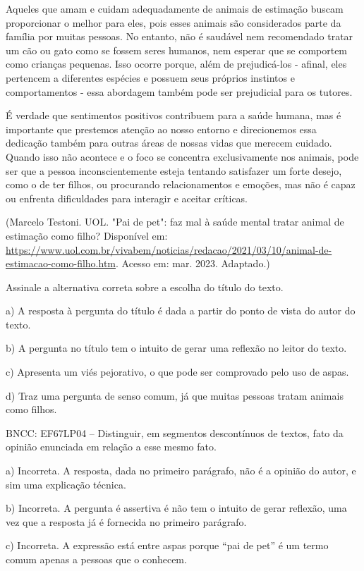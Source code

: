 Aqueles que amam e cuidam adequadamente de animais de estimação buscam
proporcionar o melhor para eles, pois esses animais são considerados
parte da família por muitas pessoas. No entanto, não é saudável nem
recomendado tratar um cão ou gato como se fossem seres humanos, nem
esperar que se comportem como crianças pequenas. Isso ocorre porque,
além de prejudicá-los - afinal, eles pertencem a diferentes espécies e
possuem seus próprios instintos e comportamentos - essa abordagem também
pode ser prejudicial para os tutores.

É verdade que sentimentos positivos contribuem para a saúde humana, mas
é importante que prestemos atenção ao nosso entorno e direcionemos essa
dedicação também para outras áreas de nossas vidas que merecem cuidado.
Quando isso não acontece e o foco se concentra exclusivamente nos
animais, pode ser que a pessoa inconscientemente esteja tentando
satisfazer um forte desejo, como o de ter filhos, ou procurando
relacionamentos e emoções, mas não é capaz ou enfrenta dificuldades para
interagir e aceitar críticas.

(Marcelo Testoni. UOL. "Pai de pet": faz mal à saúde mental tratar
animal de estimação como filho? Disponível em:
\url{https://www.uol.com.br/vivabem/noticias/redacao/2021/03/10/animal-de-estimacao-como-filho.htm}.
Acesso em: mar. 2023. Adaptado.)

Assinale a alternativa correta sobre a escolha do título do texto.

a) A resposta à pergunta do título é dada a partir do ponto de vista do
autor do texto.

b) A pergunta no título tem o intuito de gerar uma reflexão no leitor do
texto.

c) Apresenta um viés pejorativo, o que pode ser comprovado pelo uso de
aspas.

d) Traz uma pergunta de senso comum, já que muitas pessoas tratam
animais como filhos.

BNCC: EF67LP04 -- Distinguir, em segmentos descontínuos de textos, fato
da opinião enunciada em relação a esse mesmo fato.

a) Incorreta. A resposta, dada no primeiro parágrafo, não é a opinião do
autor, e sim uma explicação técnica.

b) Incorreta. A pergunta é assertiva é não tem o intuito de gerar
reflexão, uma vez que a resposta já é fornecida no primeiro parágrafo.

c) Incorreta. A expressão está entre aspas porque ``pai de pet'' é um
termo comum apenas a pessoas que o conhecem.

